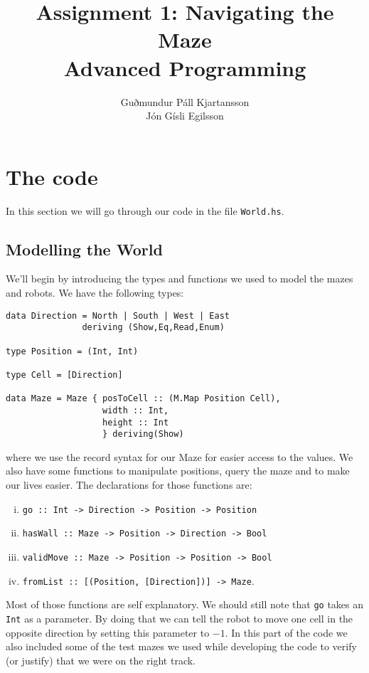 \documentclass[a4paper,10pt]{article}
\title{
	Assignment 1: Navigating the Maze\\
	Advanced Programming
  }
\author{
	Guðmundur Páll Kjartansson\\
	Jón Gísli Egilsson	
}
\begin{document}
\maketitle

\section{The code}

In this section we will go through our code in the file \verb=World.hs=.

\subsection{Modelling the World}

We'll begin by introducing the types and functions we used to model the mazes and robots. We have the following types:
\begin{verbatim}
data Direction = North | South | West | East 
               deriving (Show,Eq,Read,Enum)

type Position = (Int, Int)

type Cell = [Direction]

data Maze = Maze { posToCell :: (M.Map Position Cell),
                   width :: Int,
                   height :: Int 
                   } deriving(Show)
\end{verbatim}
where we use the record syntax for our Maze for easier access to the values. We also have some functions to manipulate positions, query the maze and to make our lives easier. The declarations for those functions are:
\begin{enumerate}[i.]
	\item \verb=go :: Int -> Direction -> Position -> Position=
	\item \verb=hasWall :: Maze -> Position -> Direction -> Bool=
	\item \verb=validMove :: Maze -> Position -> Position -> Bool=
	\item \verb=fromList :: [(Position, [Direction])] -> Maze=.
\end{enumerate}
Most of those functions are self explanatory. We should still note that \verb=go= takes an \verb=Int= as a parameter. By doing that we can tell the robot to move one cell in the opposite direction by setting this parameter to $-1$. In this part of the code we also included some of the test mazes we used while developing the code to verify (or justify) that we were on the right track.
\end{document}
